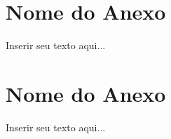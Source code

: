 %
%

\begin{anexosenv}
\partanexos

\chapter{Nome do Anexo}
\label{chap:anexox}

Inserir seu texto aqui...

\chapter{Nome do Anexo}
\label{chap:anexoy}

Inserir seu texto aqui...

\end{anexosenv}
